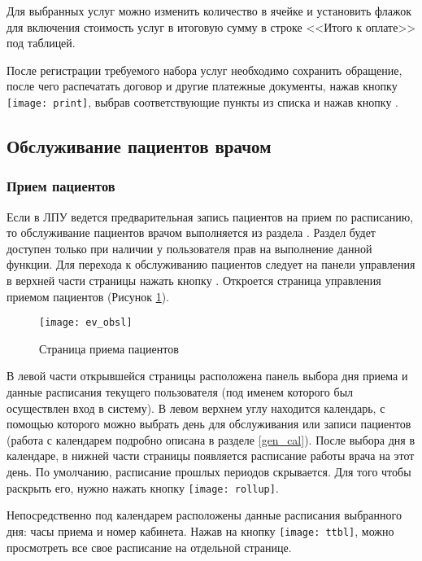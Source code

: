 Для выбранных услуг можно изменить количество в ячейке  и установить флажок  для включения стоимость услуг в итоговую сумму в строке <<Итого к оплате>> под таблицей. 

После регистрации требуемого набора услуг необходимо сохранить обращение, после чего распечатать договор и другие платежные документы, нажав кнопку \texttt{[image: print]}, выбрав соответствующие пункты из списка и нажав кнопку .

\subsection{Обслуживание пациентов врачом} \label{pol_doc}
\subsubsection{Прием пациентов} \label{pol_doc_priem}

Если в ЛПУ ведется предварительная запись пациентов на прием по расписанию, то обслуживание пациентов врачом выполняется из раздела . Раздел будет доступен только при наличии у пользователя прав на выполнение данной функции.
Для перехода к обслуживанию пациентов следует на панели управления в верхней части страницы нажать кнопку . Откроется страница управления приемом пациентов (Рисунок \ref{img_ev_obsl}). 

\begin{figure}[ht]\centering
	\texttt{[image: ev\_obsl]}
	\caption{Страница приема пациентов}
	\label{img_ev_obsl}
\end{figure}

В левой части открывшейся страницы расположена панель выбора дня приема и данные расписания текущего пользователя (под именем которого был осуществлен вход в систему). В левом верхнем углу находится календарь, с помощью которого можно выбрать день для обслуживания или записи пациентов (работа с календарем подробно описана в разделе \ref{gen_cal}). После выбора дня в календаре, в нижней части страницы появляется расписание работы врача на этот день. По умолчанию, расписание прошлых периодов скрывается. Для того чтобы раскрыть его, нужно нажать кнопку \texttt{[image: rollup]}.    

Непосредственно под календарем расположены данные расписания выбранного дня: часы приема и номер кабинета. Нажав на кнопку \texttt{[image: ttbl]}, можно просмотреть все свое расписание на отдельной странице.

